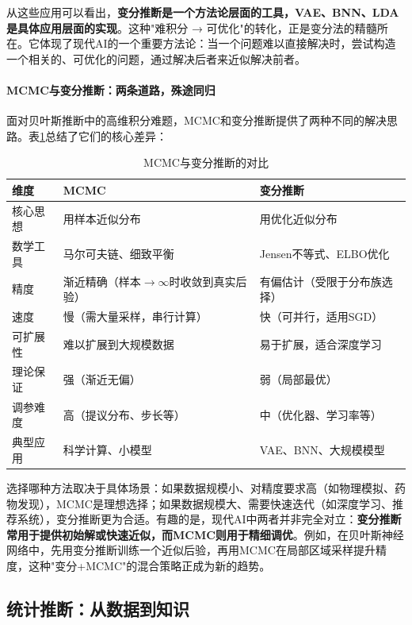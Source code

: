 从这些应用可以看出，\textbf{变分推断是一个方法论层面的工具，VAE、BNN、LDA是具体应用层面的实现}。这种"难积分 → 可优化"的转化，正是变分法的精髓所在。它体现了现代AI的一个重要方法论：当一个问题难以直接解决时，尝试构造一个相关的、可优化的问题，通过解决后者来近似解决前者。

\paragraph{MCMC与变分推断：两条道路，殊途同归}

面对贝叶斯推断中的高维积分难题，MCMC和变分推断提供了两种不同的解决思路。表\ref{tab:mcmc_vi_comparison}总结了它们的核心差异：

\begin{table}[h]
\centering
\caption{MCMC与变分推断的对比}
\label{tab:mcmc_vi_comparison}
\begin{tabular}{l|l|l}
\hline
\textbf{维度} & \textbf{MCMC} & \textbf{变分推断} \\
\hline
核心思想 & 用样本近似分布 & 用优化近似分布 \\
数学工具 & 马尔可夫链、细致平衡 & Jensen不等式、ELBO优化 \\
精度 & 渐近精确（样本$\to\infty$时收敛到真实后验） & 有偏估计（受限于分布族选择） \\
速度 & 慢（需大量采样，串行计算） & 快（可并行，适用SGD） \\
可扩展性 & 难以扩展到大规模数据 & 易于扩展，适合深度学习 \\
理论保证 & 强（渐近无偏） & 弱（局部最优） \\
调参难度 & 高（提议分布、步长等） & 中（优化器、学习率等） \\
典型应用 & 科学计算、小模型 & VAE、BNN、大规模模型 \\
\hline
\end{tabular}
\end{table}

选择哪种方法取决于具体场景：如果数据规模小、对精度要求高（如物理模拟、药物发现），MCMC是理想选择；如果数据规模大、需要快速迭代（如深度学习、推荐系统），变分推断更为合适。有趣的是，现代AI中两者并非完全对立：\textbf{变分推断常用于提供初始解或快速近似，而MCMC则用于精细调优}。例如，在贝叶斯神经网络中，先用变分推断训练一个近似后验，再用MCMC在局部区域采样提升精度，这种"变分+MCMC"的混合策略正成为新的趋势。

\subsection{统计推断：从数据到知识}

